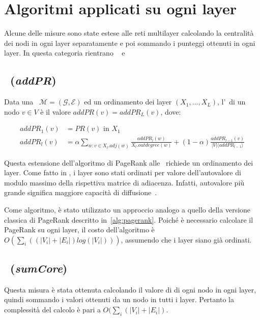 \section{Algoritmi applicati su ogni layer}
Alcune delle misure sono state estese alle reti multilayer calcolando la centralità
dei nodi in ogni layer separatamente e poi sommando i punteggi ottenuti in ogni layer.
In questa categoria rientrano \addPageRank~\cite{halu:addpagerank} 
e \sumCore~\cite{basaras:infspmul}

\subsection{\addPageRank~(\textit{addPR})}
\begin{definizione}[\addPageRank]
    Data una \muln\ $\mathcal{M}=(\mathcal{G}, \mathcal{E})$ 
    ed un ordinamento dei layer $(X_1, \dots, X_{L})$, l'\addPageRank\
    di un nodo $v \in V$ è il valore 
    $addPR(v) = addPR_L(v)$, dove:

    \begin{equation}
        \begin{split}
addPR_1(v)&= PR(v) \text{ in } X_1 \\
addPR_l(v)&= \alpha \sum_{w : v \in X_l.adj(w)} 
            \frac{addPR_l(w)}{X_l.outdegree(w)} + 
            (1-\alpha)\frac{addPR_{l-1}(v)}{|V| \langle addPR_{l-1} \rangle}
        \end{split}
    \end{equation}

\end{definizione}

Questa estensione dell'algoritmo di PageRank alle \muln\ richiede un ordinamento
dei layer. Come fatto in \cite{basaras:infspmul}, i layer sono stati ordinati per valore
dell'autovalore di modulo massimo della rispettiva matrice di adiacenza. Infatti, 
autovalore più grande significa maggiore capacità di diffusione~\cite{wang:eigenv}.

Come algoritmo, è stato utilizzato un approccio analogo a quello della versione classica di 
PageRank descritto in~\vref{alg:pagerank}.
Poiché è necessario calcolare il PageRank su ogni layer, il costo dell'algoritmo è 
$O(\sum_{i}((|V_i| + |E_i|)log(|V_i|)))$, assumendo che i layer siano già ordinati.

\subsection{\sumCore~(\textit{sumCore})}
Questa misura è stata ottenuta calcolando il valore di \kcore di ogni nodo in 
ogni layer, quindi sommando i valori ottenuti da un nodo in tutti i layer.
Pertanto la complessità del calcolo è pari a $O(\sum_{i}(|V_i| + |E_i|)$.

